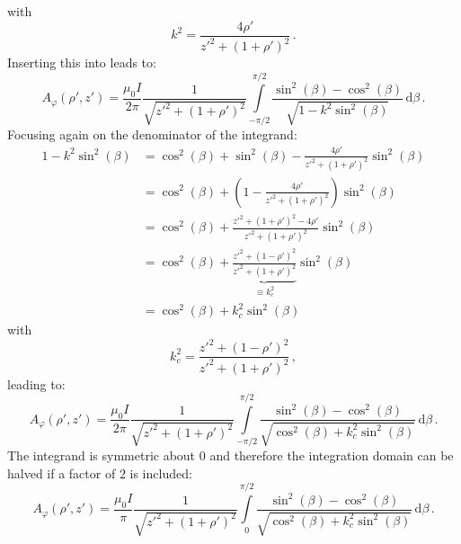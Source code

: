 with
\begin{equation}
 k^2 = \frac{4 \rho'}{z'^2 + (1 + \rho')^2} \, . \label{eqn:my_k_sq}
\end{equation}
Inserting this into  leads to:
\begin{equation}
 A_\varphi(\rho', z') = \frac{\mu_0 I}
                           {2 \pi}
                      \frac{1}
                           {\sqrt{z'^2 + (1 + \rho')^2}}
                      \int\limits_{-\pi/2}^{\pi/2}
                        \frac{\sin^2(\beta) - \cos^2(\beta)}
                             {\sqrt{1 - k^2 \sin^2(\beta)}}
                        \,\mathrm{d}\beta \, .
\end{equation}
Focusing again on the denominator of the integrand:
\begin{align}
 1 - k^2 \sin^2(\beta)
   &= \cos^2(\beta) + \sin^2(\beta) - \frac{4 \rho'}{z'^2 + (1 + \rho')^2} \sin^2(\beta) \nonumber \\
 ~ &= \cos^2(\beta) + \left(1 - \frac{4 \rho'}{z'^2 + (1 + \rho')^2}\right) \sin^2(\beta) \nonumber \\
 ~ &= \cos^2(\beta) + \frac{z'^2 + (1 + \rho')^2 - 4 \rho'}{z'^2 + (1 + \rho')^2} \sin^2(\beta) \nonumber \\
 ~ &= \cos^2(\beta) + \underbrace{\frac{z'^2 + (1 - \rho')^2}{z'^2 + (1 + \rho')^2}}_{\equiv k_c^2} \sin^2(\beta) \nonumber \\
 ~ &= \cos^2(\beta) + k_c^2 \sin^2(\beta) \label{eqn:a_phi_denom_refactor_done}
\end{align}
with
\begin{equation}
 k_c^2 = \frac{z'^2 + (1 - \rho')^2}{z'^2 + (1 + \rho')^2} \, , \label{eqn:k_c_final}
\end{equation}
leading to:
\begin{equation}
 A_\varphi(\rho', z') = \frac{\mu_0 I}
                           {2 \pi}
                      \frac{1}
                           {\sqrt{z'^2 + (1 + \rho')^2}}
                      \int\limits_{-\pi/2}^{\pi/2}
                        \frac{\sin^2(\beta) - \cos^2(\beta)}
                             {\sqrt{\cos^2(\beta) + k_c^2 \sin^2(\beta)}}
                        \,\mathrm{d}\beta \, .
\end{equation}
The integrand is symmetric about $0$ and therefore the integration domain can be halved if a factor of $2$ is included:
\begin{equation}
 A_\varphi(\rho', z') = \frac{\mu_0 I}
                           {\pi}
                      \frac{1}
                           {\sqrt{z'^2 + (1 + \rho')^2}}
                      \int\limits_{0}^{\pi/2}
                        \frac{\sin^2(\beta) - \cos^2(\beta)}
                             {\sqrt{\cos^2(\beta) + k_c^2 \sin^2(\beta)}}
                        \,\mathrm{d}\beta \, .
\end{equation}
